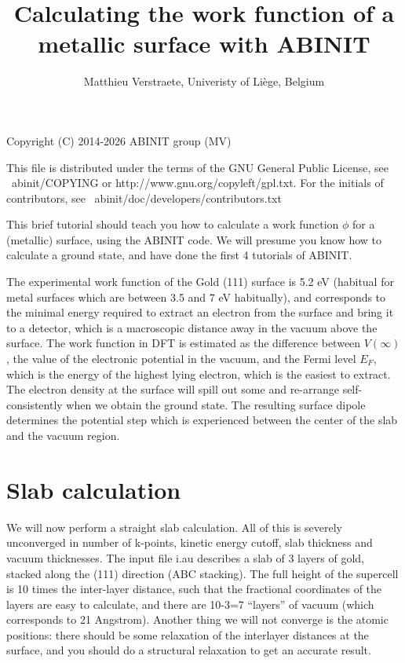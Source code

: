 \documentclass{report}
\begin{document}
\title{Calculating the work function of a metallic surface with ABINIT}

\author{Matthieu Verstraete, Univeristy of Li\`ege, Belgium}

\maketitle
Copyright (C) 2014-2026 ABINIT group (MV)

This file is distributed under the terms of the
GNU General Public License, see ~abinit/COPYING
or http://www.gnu.org/copyleft/gpl.txt.
For the initials of contributors, see ~abinit/doc/developers/contributors.txt

This brief tutorial should teach you how to calculate a work function $\phi$ for a (metallic) surface, using the ABINIT code. We will presume you know how to calculate a ground state, and have done the first 4 tutorials of ABINIT.

The experimental work function of the Gold (111) surface is 5.2 eV (habitual for metal surfaces which are between 3.5 and 7 eV habitually), and corresponds to the minimal energy required to extract an electron from the surface and bring it to a detector, which is a macroscopic distance away in the vacuum above the surface. The work function in DFT is estimated as the difference between $V(\infty)$, the value of the electronic potential in the vacuum, and the Fermi level $E_F$, which is the energy of the highest lying electron, which is the easiest to extract. The electron density at the surface will spill out some and re-arrange self-consistently when we obtain the ground state. The resulting surface dipole determines the potential step which is experienced between the center of the slab and the vacuum region.

\section{Slab calculation}
We will now perform a straight slab calculation. All of this is severely unconverged in number of k-points, kinetic energy cutoff,  slab thickness and vacuum thicknesses. The input file i.au describes a slab of 3 layers of gold, stacked along the (111) direction (ABC stacking). The full height of the supercell is 10 times the inter-layer distance, such that the fractional coordinates of the layers are easy to calculate, and there are 10-3=7 ``layers'' of vacuum (which corresponds to 21 Angstrom). Another thing we will not converge is the atomic positions: there should be some relaxation of the interlayer distances at the surface, and you should do a structural relaxation to get an accurate result.
\end{document}
